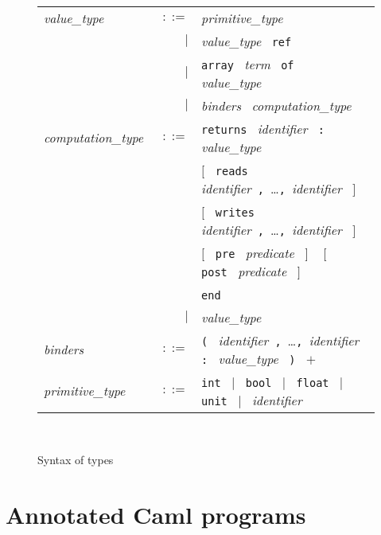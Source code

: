 \documentclass[12pt]{report}
\newcommand{\te}[1]{\texttt{#1}~}
\newcommand{\nt}[1]{\textsl{#1}~}
\begin{document}
\begin{figure}[htbp]
\begin{center}
\hrulefill\\
\begin{tabular}{lrl}
  \nt{value\_type}
    & $::=$ & \nt{primitive\_type} \\
      & $|$ & \nt{value\_type} \te{ref} \\
      & $|$ & \te{array} \nt{term} \te{of} \nt{value\_type} \\
      & $|$ & \nt{binders} \nt{computation\_type} 
  \\[0.1em]

  \nt{computation\_type}
    & $::=$ & \te{returns} \nt{identifier} \te{:} \nt{value\_type} \\
      &     & $[$~ \te{reads} 
                   \nt{identifier}\te{,}\ldots\te{,}\nt{identifier} $]$~ \\
      &     & $[$~ \te{writes} 
                   \nt{identifier}\te{,}\ldots\te{,}\nt{identifier} $]$~ \\
      &     & $[$~ \te{pre} \nt{predicate} $]$ ~ 
              $[$~ \te{post} \nt{predicate} $]$ \\
      &     & \te{end} \\
      & $|$ & \nt{value\_type}
  \\[0.1em]

  \nt{binders}
    & $::=$ & \te{(} \nt{identifier}\te{,}\dots\te{,}\nt{identifier}  \te{:}
              \nt{value\_type}  \te{)} $+$ 
  \\[0.1em]

  \nt{primitive\_type}
    & $::=$ & \te{int} $|$~ \te{bool} $|$~ \te{float} $|$~ 
              \te{unit} $|$~ \nt{identifier}
\end{tabular}\\
\hrulefill
\caption{Syntax of types}
\label{fig:types}
\end{center}		
\end{figure}

\section{Annotated Caml programs}
\end{document}
